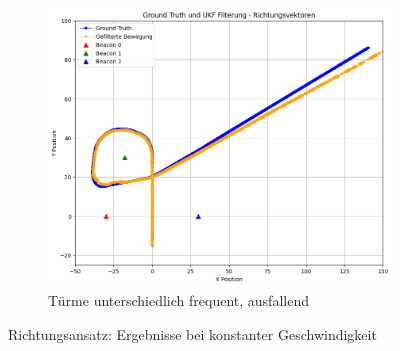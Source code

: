 \begin{figure}
\begin{subfigure}{.333\textwidth}
        \centering
        \includegraphics[width=.9\linewidth]{Ergebnisse/plots_fahrten/richtung/richtung_const_vel_flag_freq.png}
        \caption{Türme unterschiedlich frequent, ausfallend}
    \end{subfigure}
    \caption{Richtungsansatz: Ergebnisse bei konstanter Geschwindigkeit}
\end{figure}

